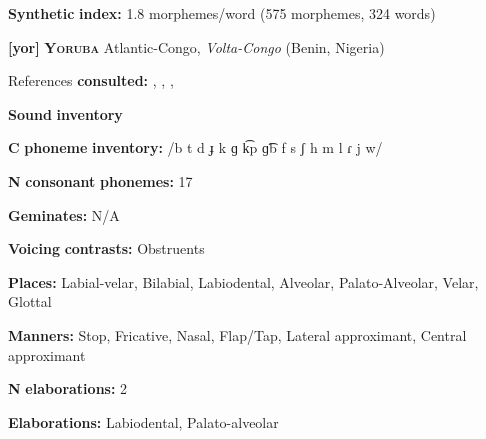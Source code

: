 \documentclass[output=paper]{langsci/langscibook}
\begin{document}
\begin{styleBody}
\textbf{Synthetic} \textbf{index:} 1.8 morphemes/word (575 morphemes, 324 words)
\end{styleBody}

\begin{styleBody}
\textbf{[yor]}   \textbf{\textsc{Yoruba}}  Atlantic-Congo, \textit{Volta-Congo} (Benin, Nigeria)
\end{styleBody}

\begin{styleBody}
References \textbf{consulted:} \citet{Bamgbose1966}, \citet{Rowlands1969}, \citet{Seidl2000}, \citet{Siertsema1959}
\end{styleBody}

\begin{styleBody}
\textbf{Sound} \textbf{inventory}
\end{styleBody}

\begin{styleBody}
\textbf{C} \textbf{phoneme} \textbf{inventory:} /b t d ɟ k ɡ k͡p ɡ͡b f s ʃ h m l ɾ j w/
\end{styleBody}

\begin{styleBody}
\textbf{N} \textbf{consonant} \textbf{phonemes:} 17
\end{styleBody}

\begin{styleBody}
\textbf{Geminates:} N/A
\end{styleBody}

\begin{styleBody}
\textbf{Voicing} \textbf{contrasts:} Obstruents
\end{styleBody}

\begin{styleBody}
\textbf{Places:} Labial-velar, Bilabial, Labiodental, Alveolar, Palato-Alveolar, Velar, Glottal
\end{styleBody}

\begin{styleBody}
\textbf{Manners:} Stop, Fricative, Nasal, Flap/Tap, Lateral approximant, Central approximant
\end{styleBody}

\begin{styleBody}
\textbf{N} \textbf{elaborations:} 2
\end{styleBody}

\begin{styleBody}
\textbf{Elaborations:} Labiodental, Palato-alveolar
\end{styleBody}
\end{document}
